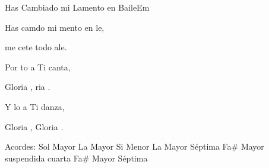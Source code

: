 \documentclass[12pt, spanish]{book}
\begin{document}
\begin{song}{Has Cambiado mi Lamento en Baile}{Em}
\begin{SBExtraKeys}
{\begin{SBOpGroup}
                Has camdo mi mento en le,

                me cete todo  ale.
            \end{SBOpGroup}

            \begin{SBChorus}
                Por to a Ti canta,

                Gloria , ria .

                Y lo a Ti danza,

                Gloria , Gloria .
            \end{SBChorus}

            \ifChordBk
            \begin{SBOpGroup}
                Acordes:
                \upchord{\G}\qquad Sol Mayor \hfill
                \upchord{\A}\qquad La Mayor \hfill\null\break
                \upchord{\Bm}\qquad\qquad Si Menor \hfill
                \upchord{\Aseven}\qquad La Mayor S\'eptima \hfill\null\break
                \upchord{\Fssus}Fa\# Mayor suspendida cuarta\qquad\qquad
                \upchord{\Fsseven}Fa\# Mayor S\'eptima \hfill\null\break
            \end{SBOpGroup}
            \fi
        }\end{SBExtraKeys}
    \end{song}
\end{document}
